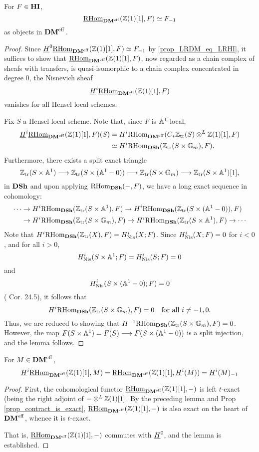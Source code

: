\begin{lem}[D\'eglise]\label{lem_rhomDM_and_contract}
For $F \in \HI$,
\[
\ihomDMf(\Z(1)[1], F) \simeq \RHI{F}
\]
as objects in $\DMeff$.
\end{lem}
\begin{proof}
Since $\sheaf{H}^0 \ihomDMf(\Z(1)[1], F) \simeq \RHI{F}$ by 
\ref{prop_LRDM_eq_LRHI}, it suffices to show that 
$\ihomDMf(\Z(1)[1], F)$, now regarded as a chain complex of
sheafs with transfers, is quasi-isomorphic to a chain complex 
concentrated in degree 0, the Nisnevich sheaf
\[
\sheaf{H}^i\ihomDMf(\Z(1)[1], F)
\]
vanishes for all Hensel local schemes.

Fix $S$ a Hensel local scheme. Note that, since $F$ is $\A^1$-local,
\begin{align*}
\sheaf{H}^i\ihomDMf(\Z(1)[1], F)(S) &= H^i\rhomDMf(\CZtr(S) 
   \tDM \Z(1)[1], F) \\
   &\simeq H^i\homDSh(\Ztr(S \times 
   \Gm), F).
\end{align*}
Furthermore, there exists a split exact triangle
\[
\Ztr(S \times \A^1) \to \Ztr(S \times (\A^1 - 0)) \to 
   \Ztr(S \times \Gm) \to \Ztr(S \times \A^1)[1],
\]
in $\DSh$ and upon applying $\homDSh(-, F)$, we have a long exact 
sequence in cohomology:
\begin{align*}
\cdots & \rightarrow H^i\homDSh(\Ztr(S \times \A^1), F) 
   \rightarrow H^i\homDSh(\Ztr(S \times (\A^1 - 0)), F) \\
 & \rightarrow H^i\homDSh(\Ztr(S \times \Gm), F) \rightarrow 
   H^i\homDSh(\Ztr(S \times \A^1), F) \rightarrow \cdots
\end{align*}
Note that $H^i\homDSh(\Ztr(X), F) = H_{\Nis}^i(X; F)$. Since
$H^i_{\Nis}(X; F) = 0$ for $i < 0$, and for all $i > 0$, 
\[
H_{\Nis}^i(S \times \A^1; F) = H_{\Nis}^i(S; F) = 0
\] 
and 
\[
H_{\Nis}^i(S \times (\A^1 - 0); F) = 0
\] 
(\cite{MVW} Cor. 24.5), it follows that 
\[
H^i\homDSh(\Ztr(S \times \Gm), F) = 0 \quad\textrm{for all $i \neq -1, 0$.}
\] 
Thus, we are reduced to showing that $H^{-1}\homDSh(\Ztr(S \times 
\Gm), F) = 0$. However, the map $F(S \times \A^1) = F(S) \to F(S 
\times (\A^1 - 0))$ is a split injection, and the lemma follows.
\end{proof}

\begin{lem}[D\'eglise]\label{lem_H_com_ihom_DM}
For $M \in \DMeff$, 
\[
\sheaf{H}^i\ihomDMf(\Z(1)[1], M) = \ihomDMf(\Z(1)[1], \sheaf{H}^i(M)) = 
   \RHI{\sheaf{H}^i(M)}
\]
\end{lem}
\begin{proof}
First, the cohomological functor $\ihomDMf(\Z(1)[1], -)$ is left 
$t$-exact (being the right adjoint of $-\tDM \Z(1)[1]$. By the 
preceding lemma and Prop \ref{prop_contract_is_exact},
$\ihomDMf(\Z(1)[1], -)$ is also exact on the heart of $\DMeff$,
whence it is $t$-exact.

That is, $\ihomDMf(\Z(1)[1], -)$ commutes with $\sheaf{H}^0$,
and the lemma is established.
\end{proof}

